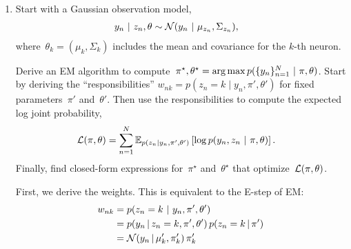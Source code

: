 \begin{enumerate}[label=(\alph*)]
\item Start with a Gaussian observation model,
\begin{align*}
    y_n ~\vert~ z_n, \theta &\sim \mathcal{N}(y_n ~\vert~ \mu_{z_n}, \Sigma_{z_n}),
\end{align*}
where~$\theta_k = (\mu_k, \Sigma_k)$ includes the mean and covariance for the $k$-th neuron.  

Derive an EM algorithm to compute~$\pi^\star, \theta^\star = \operatorname*{arg\,max} p(\{y_n\}_{n=1}^N ~\vert~ \pi, \theta)$.  Start by deriving the ``responsibilities'' $w_{nk} = p(z_n = k \mid y_n, \pi', \theta')$ for fixed parameters~$\pi'$ and~$\theta'$.  Then use the responsibilities to compute the expected log joint probability,
\begin{align*}
    \mathcal{L}(\pi, \theta) &= \sum_{n=1}^N \mathbb{E}_{p(z_n | y_n, \pi', \theta')} \left[ \log p(y_n, z_n ~\vert~ \pi, \theta) \right].
\end{align*}
Finally, find closed-form expressions for~$\pi^\star$ and~$\theta^\star$ that optimize~$\mathcal{L}(\pi, \theta)$.

\begin{solution}

First, we derive the weights. This is equivalent to the E-step of EM:
\begin{align*}
    w_{nk} &= p(z_n = k ~\vert~ y_n, \pi', \theta') \\
        &= p(y_n \,|\, z_n = k, \pi', \theta')\, p(z_n=k \,|\, \pi') \\
        &= \mathcal{N}(y_n\,|\, \mu_k', \pi_k') \, \pi_k'
\end{align*}


\end{solution}
\end{enumerate}

